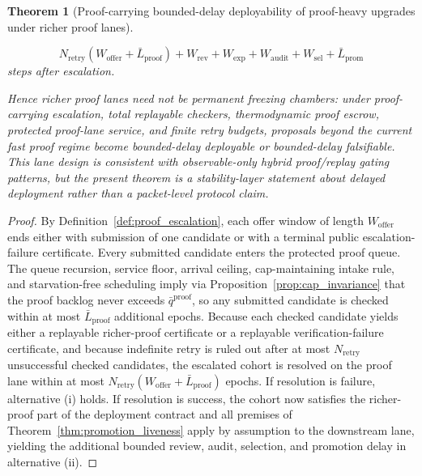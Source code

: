 \documentclass[11pt]{article}
\newtheorem{theorem}{Theorem}[section]
\theoremstyle{definition}
\newcommand{\1}{\mathbf{1}}
\begin{document}
\begin{theorem}[Proof-carrying bounded-delay deployability of proof-heavy upgrades under richer proof lanes]
\begin{enumerate}[label=(\roman*), leftmargin=2em]
\[
N_{\mathrm{retry}}(W_{\mathrm{offer}}+\bar L_{\mathrm{proof}})+W_{\mathrm{rev}}+W_{\mathrm{exp}}+W_{\mathrm{audit}}+W_{\mathrm{sel}}+\bar L_{\mathrm{prom}}
\]
steps after escalation.
\end{enumerate}
Hence richer proof lanes need not be permanent freezing chambers: under proof-carrying escalation, total replayable checkers, thermodynamic proof escrow, protected proof-lane service, and finite retry budgets, proposals beyond the current fast proof regime become bounded-delay deployable or bounded-delay falsifiable. This lane design is consistent with observable-only hybrid proof/replay gating patterns, but the present theorem is a stability-layer statement about delayed deployment rather than a packet-level protocol claim.
\end{theorem}

\begin{proof}
By Definition~\ref{def:proof_escalation}, each offer window of length $W_{\mathrm{offer}}$ ends either with submission of one candidate or with a terminal public escalation-failure certificate. Every submitted candidate enters the protected proof queue. The queue recursion, service floor, arrival ceiling, cap-maintaining intake rule, and starvation-free scheduling imply via Proposition~\ref{prop:cap_invariance} that the proof backlog never exceeds $\bar q^{\mathrm{proof}}$, so any submitted candidate is checked within at most $\bar L_{\mathrm{proof}}$ additional epochs. Because each checked candidate yields either a replayable richer-proof certificate or a replayable verification-failure certificate, and because indefinite retry is ruled out after at most $N_{\mathrm{retry}}$ unsuccessful checked candidates, the escalated cohort is resolved on the proof lane within at most $N_{\mathrm{retry}}(W_{\mathrm{offer}}+\bar L_{\mathrm{proof}})$ epochs. If resolution is failure, alternative (i) holds. If resolution is success, the cohort now satisfies the richer-proof part of the deployment contract and all premises of Theorem~\ref{thm:promotion_liveness} apply by assumption to the downstream lane, yielding the additional bounded review, audit, selection, and promotion delay in alternative (ii).
\end{proof}
\end{document}
